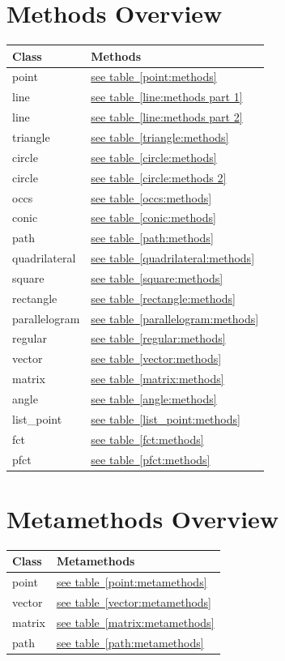 \documentclass[
  DIV=16,
  fontsize=10,
  index=totoc,
  twoside,
  cadre,
  headings=small
]{tkz-doc}
\newcommand*\tkzTableRef[1]{\hyperref[#1]{see table~\ref*{#1}}}
\begin{document}
\section*{Methods Overview}
\begin{tabular}{ll}
\textbf{Class} & \textbf{Methods} \\
\hline
point         & \tkzTableRef{point:methods}         \\
line          & \tkzTableRef{line:methods part 1} \\
line          & \tkzTableRef{line:methods part 2} \\
triangle      & \tkzTableRef{triangle:methods}      \\
circle        & \tkzTableRef{circle:methods}        \\
circle        & \tkzTableRef{circle:methods 2}    \\
occs          & \tkzTableRef{occs:methods}          \\
conic         & \tkzTableRef{conic:methods}         \\
path          & \tkzTableRef{path:methods}          \\
quadrilateral & \tkzTableRef{quadrilateral:methods} \\
square        & \tkzTableRef{square:methods}        \\
rectangle     & \tkzTableRef{rectangle:methods}     \\
parallelogram & \tkzTableRef{parallelogram:methods} \\
regular       & \tkzTableRef{regular:methods}       \\
vector        & \tkzTableRef{vector:methods}        \\
matrix        & \tkzTableRef{matrix:methods}        \\
angle         & \tkzTableRef{angle:methods}         \\
list\_point   & \tkzTableRef{list_point:methods}    \\
fct           & \tkzTableRef{fct:methods}           \\
pfct          & \tkzTableRef{pfct:methods}          \\
\end{tabular}
\section*{Metamethods Overview}
\begin{tabular}{ll}
\textbf{Class} & \textbf{Metamethods} \\
\hline
point  & \tkzTableRef{point:metamethods}  \\
vector & \tkzTableRef{vector:metamethods} \\
matrix & \tkzTableRef{matrix:metamethods} \\
path   & \tkzTableRef{path:metamethods}   \\
\end{tabular}
\clearpage
\tableofcontents
\end{document}
